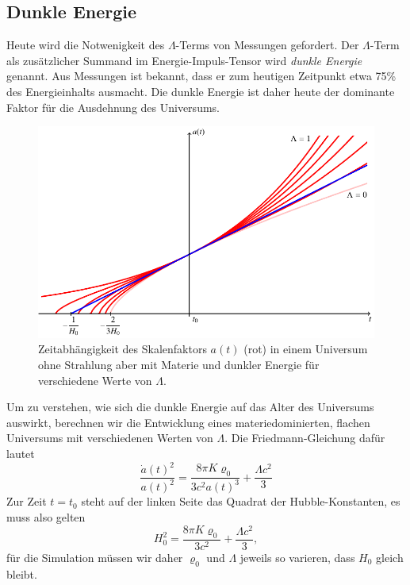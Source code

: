 \subsection{Dunkle Energie}
Heute wird die Notwenigkeit des $\Lambda$-Terms von Messungen
gefordert.
Der $\Lambda$-Term als zusätzlicher Summand im Energie-Impuls-Tensor
wird {\em dunkle Energie} genannt.
Aus Messungen ist bekannt, dass er zum heutigen Zeitpunkt etwa 75\%
des Energieinhalts ausmacht.
Die dunkle Energie ist daher heute der dominante Faktor für die
Ausdehnung des Universums.
\begin{figure}
\centering
\includegraphics{chapters/tikz/darkenergy.pdf}
\caption{Zeitabhängigkeit des Skalenfaktors $a(t)$ ({\color{red}rot})
in einem Universum ohne Strahlung aber mit Materie und dunkler Energie
für verschiedene Werte von $\Lambda$.
\label{skript:friedman:graph:darkenergy}}
\end{figure}

Um zu verstehen, wie sich die dunkle Energie auf das Alter des Universums
auswirkt, berechnen wir die Entwicklung eines materiedominierten, flachen 
Universums mit verschiedenen Werten von $\Lambda$.
Die Friedmann-Gleichung dafür lautet
\[
\frac{\dot a(t)^2}{a(t)^2}
=
\frac{8\pi K \varrho_0}{3c^2a(t)^3} + \frac{\Lambda c^2}{3}
\]
Zur Zeit $t=t_0$ steht auf der linken Seite das Quadrat der Hubble-Konstanten,
es muss also gelten
\[
H_0^2
=
\frac{8\pi K \varrho_0}{3c^2} + \frac{\Lambda c^2}{3},
\]
für die Simulation müssen wir daher $\varrho_0$ und $\Lambda$ jeweils
so varieren, dass $H_0$ gleich bleibt.

